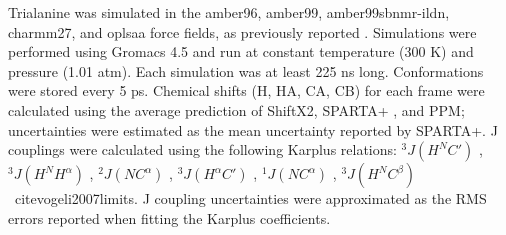 \documentclass[journal=jacsat,manuscript=article]{achemso}
\begin{document}
Trialanine was simulated in the amber96\cite{kollman1996}, amber99\cite{wang2000}, amber99sbnmr-ildn\cite{li2010}, charmm27\cite{mackerell2004extending,bjelkmar2010implementation}, and oplsaa\cite{kaminski2001evaluation} force fields, as previously reported \cite{beauchamp2012protein}.  Simulations were performed using Gromacs 4.5 \cite{hess2008} and run at constant temperature (300 K) and pressure (1.01 atm).  Each simulation was at least 225 ns long.  Conformations were stored every 5 ps.  Chemical shifts (H, HA, CA, CB) for each frame were calculated using the average prediction of ShiftX2\cite{han2011shiftx2}, SPARTA+ \cite{Shen2010}, and PPM\cite{li2012ppm}; uncertainties were estimated as the mean uncertainty reported by SPARTA+. J couplings were calculated using the following Karplus relations: $^3J(H^N C')$ \cite{Schmidt1999}, $^3J(H^N H^\alpha)$ \cite{vogeli2007limits}, $^2J(N C^\alpha)$ \cite{Graf2007}, $^3J(H^\alpha C')$ \cite{Schmidt1999}, $^1J(N C^\alpha)$ \cite{Graf2007}, $^3J(H^N C^\beta)$ \
cite{vogeli2007limits}.  J coupling uncertainties were approximated as the RMS errors reported when fitting the Karplus coefficients.  



\end{document}
